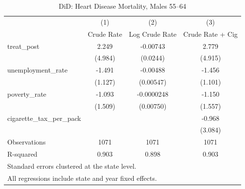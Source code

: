 \begin{table}[htbp]\centering
\def\sym#1{\ifmmode^{#1}\else\(^{#1}\)\fi}
\caption{DiD: Heart Disease Mortality, Males 55--64}
\begin{tabular}{l*{3}{c}}
\toprule
                    &\multicolumn{1}{c}{(1)}&\multicolumn{1}{c}{(2)}&\multicolumn{1}{c}{(3)}\\
                    &\multicolumn{1}{c}{Crude Rate}&\multicolumn{1}{c}{Log Crude Rate}&\multicolumn{1}{c}{Crude Rate + Cig}\\
\midrule
treat\_post          &       2.249         &    -0.00743         &       2.779         \\
                    &     (4.984)         &    (0.0244)         &     (4.915)         \\
\addlinespace
unemployment\_rate   &      -1.491         &    -0.00488         &      -1.456         \\
                    &     (1.127)         &   (0.00547)         &     (1.101)         \\
\addlinespace
poverty\_rate        &      -1.093         &  -0.0000248         &      -1.150         \\
                    &     (1.509)         &   (0.00750)         &     (1.557)         \\
\addlinespace
cigarette\_tax\_per\_pack&                     &                     &      -0.968         \\
                    &                     &                     &     (3.084)         \\
\midrule
Observations        &        1071         &        1071         &        1071         \\
R-squared           &       0.903         &       0.898         &       0.903         \\
\bottomrule
\multicolumn{4}{l}{\footnotesize Standard errors clustered at the state level.}\\
\multicolumn{4}{l}{\footnotesize All regressions include state and year fixed effects.}\\
\end{tabular}
\end{table}
